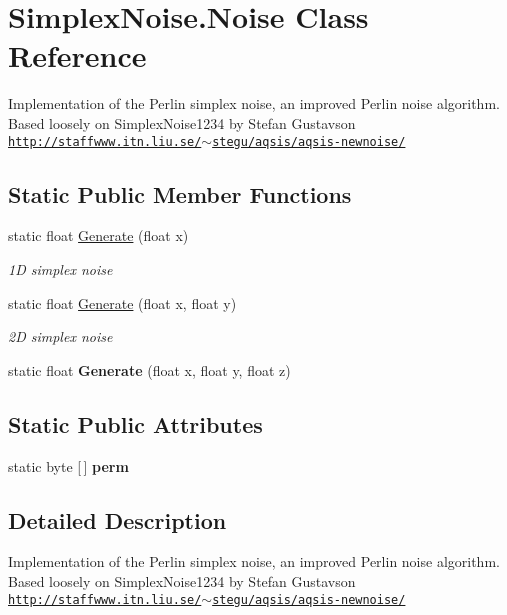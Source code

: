 \hypertarget{class_simplex_noise_1_1_noise}{}\section{Simplex\+Noise.\+Noise Class Reference}
\label{class_simplex_noise_1_1_noise}


Implementation of the Perlin simplex noise, an improved Perlin noise algorithm. Based loosely on Simplex\+Noise1234 by Stefan Gustavson \href{http://staffwww.itn.liu.se/~stegu/aqsis/aqsis-newnoise/}{\tt http\+://staffwww.\+itn.\+liu.\+se/$\sim$stegu/aqsis/aqsis-\/newnoise/}  


\subsection*{Static Public Member Functions}
\begin{DoxyCompactItemize}
\item 
static float \hyperlink{class_simplex_noise_1_1_noise_ab06f7e36078de3f6e050464076fae245}{Generate} (float x)
\begin{DoxyCompactList}\small\item\em 1D simplex noise \end{DoxyCompactList}\item 
static float \hyperlink{class_simplex_noise_1_1_noise_a4f34ca0d2996f9ea0d3a05eba853a6bd}{Generate} (float x, float y)
\begin{DoxyCompactList}\small\item\em 2D simplex noise \end{DoxyCompactList}\item 
\mbox{\label{class_simplex_noise_1_1_noise_a46452242b3e8610a365c32b5c4f0ecc7}} 
static float {\bfseries Generate} (float x, float y, float z)
\end{DoxyCompactItemize}
\subsection*{Static Public Attributes}
\begin{DoxyCompactItemize}
\item 
static byte \mbox{[}$\,$\mbox{]} {\bfseries perm}
\end{DoxyCompactItemize}


\subsection{Detailed Description}
Implementation of the Perlin simplex noise, an improved Perlin noise algorithm. Based loosely on Simplex\+Noise1234 by Stefan Gustavson \href{http://staffwww.itn.liu.se/~stegu/aqsis/aqsis-newnoise/}{\tt http\+://staffwww.\+itn.\+liu.\+se/$\sim$stegu/aqsis/aqsis-\/newnoise/} 



